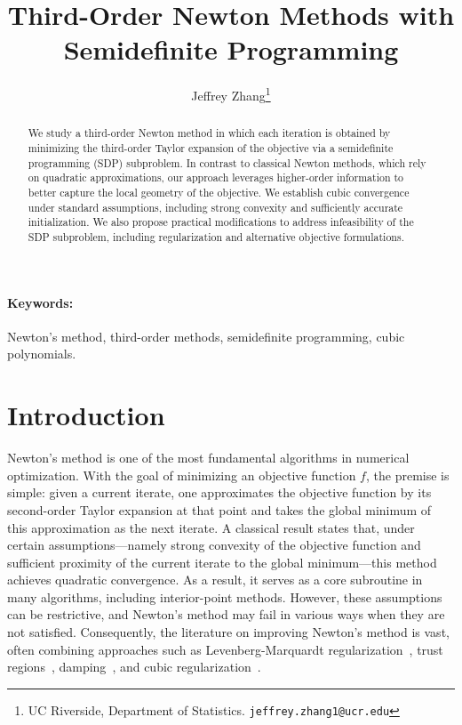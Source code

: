 \documentclass[11pt]{article}
\title{\LARGE \bf Third-Order Newton Methods with Semidefinite Programming}
\author{Jeffrey Zhang\thanks{UC Riverside, Department of Statistics. \texttt{jeffrey.zhang1@ucr.edu}}}
\theoremstyle{plain}
\theoremstyle{definition}
\theoremstyle{remark}
\begin{document}
\date{}
\maketitle
\begin{abstract}
	\noindent We study a third-order Newton method in which each iteration is obtained by minimizing the third-order Taylor expansion of the objective via a semidefinite programming (SDP) subproblem. In contrast to classical Newton methods, which rely on quadratic approximations, our approach leverages higher-order information to better capture the local geometry of the objective. We establish cubic convergence under standard assumptions, including strong convexity and sufficiently accurate initialization. We also propose practical modifications to address infeasibility of the SDP subproblem, including regularization and alternative objective formulations.
\end{abstract}

\paragraph{Keywords:} {\small Newton's method, third-order methods, semidefinite programming, cubic polynomials.}

\section{Introduction}\label{Sec: Introduction}

Newton's method is one of the most fundamental algorithms in numerical optimization. With the goal of minimizing an objective function $f$, the premise is simple: given a current iterate, one approximates the objective function by its second-order Taylor expansion at that point and takes the global minimum of this approximation as the next iterate. A classical result states that, under certain assumptions—namely strong convexity of the objective function and sufficient proximity of the current iterate to the global minimum—this method achieves quadratic convergence. As a result, it serves as a core subroutine in many algorithms, including interior-point methods. However, these assumptions can be restrictive, and Newton's method may fail in various ways when they are not satisfied. Consequently, the literature on improving Newton's method is vast, often combining approaches such as Levenberg-Marquardt regularization~\cite{levenberg1944method,marquardt1963algorithm}, trust regions~\cite{Powell1970ANA, Mor1982RecentDI, conn2000trust}, damping~\cite{ortega2000iterative}, and cubic regularization~\cite{nesterov2006cubic}.
\end{document}
